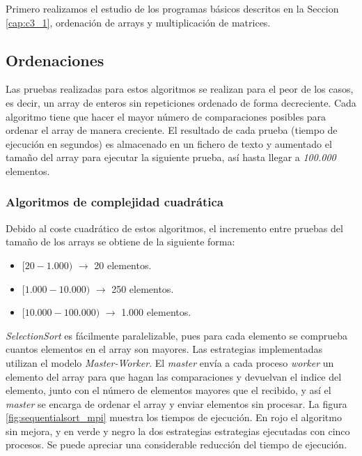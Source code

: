 Primero realizamos el estudio de los programas básicos descritos en la Seccion \ref{cap:c3_1}, ordenación de arrays y multiplicación de matrices.

	\subsection{Ordenaciones}
	
	Las pruebas realizadas para estos algoritmos se realizan para el peor de los casos, es decir, un array de enteros sin repeticiones ordenado de forma decreciente. Cada algoritmo tiene que hacer el mayor número de comparaciones posibles para ordenar el array de manera creciente. El resultado de cada prueba (tiempo de ejecución en segundos) es almacenado en un fichero de texto y aumentado el tamaño del array para ejecutar la siguiente prueba, así hasta llegar a \textit{100.000} elementos.	
	
		\subsubsection{Algoritmos de complejidad cuadrática}		
		
		Debido al coste cuadrático de estos algoritmos, el incremento entre pruebas del tamaño de los arrays se obtiene de la siguiente forma:
		\begin{itemize}
			\vspace*{-0.2cm}	
			\item \([20-1.000)\) $\rightarrow$ 20 elementos.
			\vspace*{-0.4cm}	
			\item \([1.000-10.000)\) $\rightarrow$ 250 elementos.
			\vspace*{-0.4cm}	
			\item \([10.000-100.000)\) $\rightarrow$ 1.000 elementos.					
		\end{itemize}
		
		
		
		\textit{SelectionSort} es fácilmente paralelizable, pues para cada elemento se comprueba cuantos elementos en el array son mayores. Las estrategias implementadas utilizan el modelo \textit{Master-Worker}. El \textit{master} envía a cada proceso \textit{worker} un elemento del array para que hagan las comparaciones y devuelvan el indice del elemento, junto con el número de elementos mayores que el recibido, y así el \textit{master} se encarga de ordenar el array y enviar elementos sin procesar. La figura \ref{fig:sequentialsort_mpi} muestra los tiempos de ejecución. En rojo el algoritmo sin mejora, y en verde y negro la dos estrategias estrategias ejecutadas con cinco procesos. Se puede apreciar una considerable reducción del tiempo de ejecución. 
		
